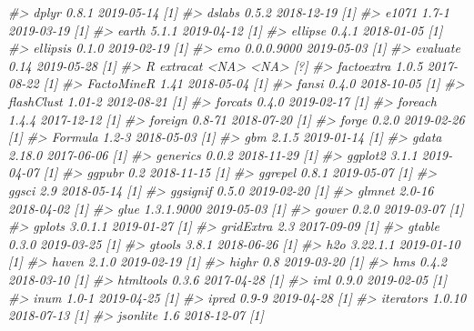\documentclass[]{krantz}
\makeatletter
\newenvironment{Shaded}{\begin{snugshade}}{\end{snugshade}}
\newcommand{\CommentTok}[1]{\textcolor[rgb]{0.37,0.37,0.37}{\textit{#1}}}
\newenvironment{kframe}{%
\medskip{}
\setlength{\fboxsep}{.8em}
 \def\at@end@of@kframe{}%
 \ifinner\ifhmode%
  \def\at@end@of@kframe{\end{minipage}}%
  \begin{minipage}{\columnwidth}%
 \fi\fi%
 \def\FrameCommand##1{\hskip\@totalleftmargin \hskip-\fboxsep
 \colorbox{shadecolor}{##1}\hskip-\fboxsep
     \hskip-\linewidth \hskip-\@totalleftmargin \hskip\columnwidth}%
 \MakeFramed {\advance\hsize-\width
   \@totalleftmargin\z@ \linewidth\hsize
   \@setminipage}}%
 {\par\unskip\endMakeFramed%
 \at@end@of@kframe}
\renewenvironment{Shaded}{\begin{kframe}}{\end{kframe}}
\makeatother
\begin{document}
\begin{Shaded}
\begin{Highlighting}[]
\CommentTok{#>    dplyr           0.8.1      2019-05-14 [1]}
\CommentTok{#>    dslabs          0.5.2      2018-12-19 [1]}
\CommentTok{#>    e1071           1.7-1      2019-03-19 [1]}
\CommentTok{#>    earth           5.1.1      2019-04-12 [1]}
\CommentTok{#>    ellipse         0.4.1      2018-01-05 [1]}
\CommentTok{#>    ellipsis        0.1.0      2019-02-19 [1]}
\CommentTok{#>    emo             0.0.0.9000 2019-05-03 [1]}
\CommentTok{#>    evaluate        0.14       2019-05-28 [1]}
\CommentTok{#>  R extracat        <NA>       <NA>       [?]}
\CommentTok{#>    factoextra      1.0.5      2017-08-22 [1]}
\CommentTok{#>    FactoMineR      1.41       2018-05-04 [1]}
\CommentTok{#>    fansi           0.4.0      2018-10-05 [1]}
\CommentTok{#>    flashClust      1.01-2     2012-08-21 [1]}
\CommentTok{#>    forcats         0.4.0      2019-02-17 [1]}
\CommentTok{#>    foreach         1.4.4      2017-12-12 [1]}
\CommentTok{#>    foreign         0.8-71     2018-07-20 [1]}
\CommentTok{#>    forge           0.2.0      2019-02-26 [1]}
\CommentTok{#>    Formula         1.2-3      2018-05-03 [1]}
\CommentTok{#>    gbm             2.1.5      2019-01-14 [1]}
\CommentTok{#>    gdata           2.18.0     2017-06-06 [1]}
\CommentTok{#>    generics        0.0.2      2018-11-29 [1]}
\CommentTok{#>    ggplot2         3.1.1      2019-04-07 [1]}
\CommentTok{#>    ggpubr          0.2        2018-11-15 [1]}
\CommentTok{#>    ggrepel         0.8.1      2019-05-07 [1]}
\CommentTok{#>    ggsci           2.9        2018-05-14 [1]}
\CommentTok{#>    ggsignif        0.5.0      2019-02-20 [1]}
\CommentTok{#>    glmnet          2.0-16     2018-04-02 [1]}
\CommentTok{#>    glue            1.3.1.9000 2019-05-03 [1]}
\CommentTok{#>    gower           0.2.0      2019-03-07 [1]}
\CommentTok{#>    gplots          3.0.1.1    2019-01-27 [1]}
\CommentTok{#>    gridExtra       2.3        2017-09-09 [1]}
\CommentTok{#>    gtable          0.3.0      2019-03-25 [1]}
\CommentTok{#>    gtools          3.8.1      2018-06-26 [1]}
\CommentTok{#>    h2o             3.22.1.1   2019-01-10 [1]}
\CommentTok{#>    haven           2.1.0      2019-02-19 [1]}
\CommentTok{#>    highr           0.8        2019-03-20 [1]}
\CommentTok{#>    hms             0.4.2      2018-03-10 [1]}
\CommentTok{#>    htmltools       0.3.6      2017-04-28 [1]}
\CommentTok{#>    iml             0.9.0      2019-02-05 [1]}
\CommentTok{#>    inum            1.0-1      2019-04-25 [1]}
\CommentTok{#>    ipred           0.9-9      2019-04-28 [1]}
\CommentTok{#>    iterators       1.0.10     2018-07-13 [1]}
\CommentTok{#>    jsonlite        1.6        2018-12-07 [1]}

\end{Highlighting}
\end{Shaded}
\end{document}
